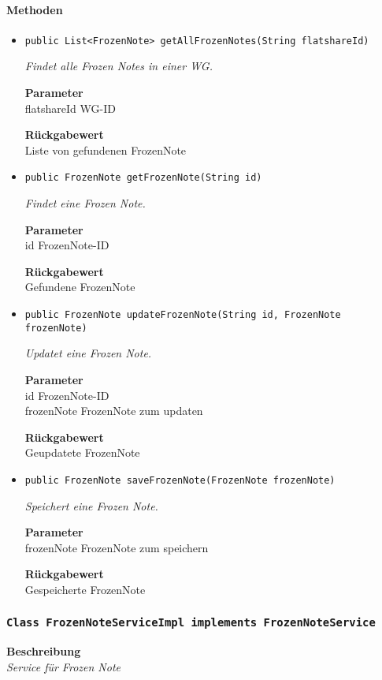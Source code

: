      \paragraph*{Methoden}
     \begin{itemize}
     	\item{\texttt{public List<FrozenNote> getAllFrozenNotes(String flatshareId)}}
     	
     	\textit{Findet alle Frozen Notes in einer WG.}
     	
     	\textbf{Parameter} \\
     	flatshareId WG-ID
     	
     	\textbf{Rückgabewert} \\
     	Liste von gefundenen FrozenNote        \item{\texttt{public FrozenNote getFrozenNote(String id)}}
     	
     	\textit{Findet eine Frozen Note.}
     	
     	\textbf{Parameter} \\
     	id FrozenNote-ID
     	
     	\textbf{Rückgabewert} \\
     	Gefundene FrozenNote        \item{\texttt{public FrozenNote updateFrozenNote(String id, FrozenNote frozenNote)}}
     	
     	\textit{Updatet eine Frozen Note.}
     	
     	\textbf{Parameter} \\
     	id FrozenNote-ID\\
     	frozenNote FrozenNote zum updaten
     	
     	\textbf{Rückgabewert} \\
     	Geupdatete FrozenNote        \item{\texttt{public FrozenNote saveFrozenNote(FrozenNote frozenNote)}}
     	
     	\textit{Speichert eine Frozen Note.}
     	
     	\textbf{Parameter} \\
     	frozenNote FrozenNote zum speichern
     	
     	\textbf{Rückgabewert} \\
     	Gespeicherte FrozenNote
     \end{itemize}
     \subsubsection{\texttt{Class FrozenNoteServiceImpl implements FrozenNoteService}}
     \textbf{Beschreibung} \\
     \textit{Service für Frozen Note}
